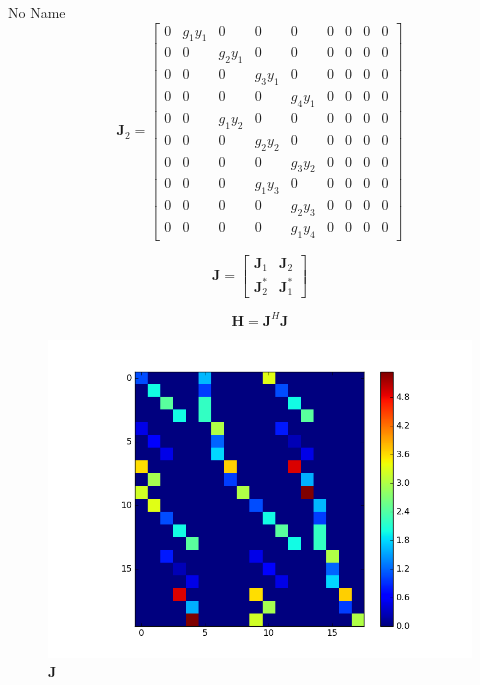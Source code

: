 \documentclass[a4paper,10pt]{article}
\begin{document}
\begin{section}{No Name}
\begin{equation}
\boldsymbol{J}_2 = 
\begin{bmatrix}
 0&g_1y_1&0&0&0&0&0&0&0\\
 0&0&g_2y_1&0&0&0&0&0&0\\
 0&0&0&g_3y_1&0&0&0&0&0\\
 0&0&0&0&g_4y_1&0&0&0&0\\
 0&0&g_1y_2&0&0&0&0&0&0\\
 0&0&0&g_2y_2&0&0&0&0&0\\
 0&0&0&0&g_3 y_2&0&0&0&0\\
 0&0&0&g_1 y_3&0&0&0&0&0\\
 0&0&0&0&g_2 y_3&0&0&0&0\\
 0&0&0&0&g_1 y_4&0&0&0&0                   
\end{bmatrix}
\end{equation}

\begin{equation}
\boldsymbol{J} = 
\begin{bmatrix}
\boldsymbol{J}_1 & \boldsymbol{J}_2\\
\boldsymbol{J}_2^*& \boldsymbol{J}_1^* 
\end{bmatrix}
\end{equation}

\begin{equation}
\boldsymbol{H} = \boldsymbol{J}^H\boldsymbol{J} 
\end{equation}

\begin{figure}
  \includegraphics[width=\linewidth]{Jacobian.png}
  \caption{$\boldsymbol{J}$}
\end{figure}


\end{section}
\end{document}
